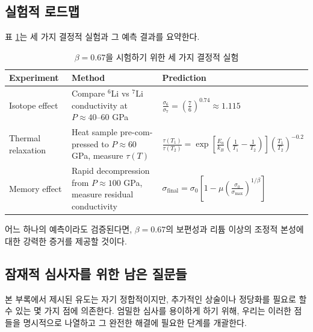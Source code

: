 \documentclass[11pt,a4paper]{article}
\theoremstyle{remark}
\begin{document}
	\subsection{실험적 로드맵}
	
	표 \ref{tab:experiments}는 세 가지 결정적 실험과 그 예측 결과를 요약한다.
	
	\begin{table}[H]
		\begin{otherlanguage}{english}
			\centering
			\caption{Three decisive experiments to test \(\beta = 0.67\)}
			\label{tab:experiments}
			\begin{tabular}{p{}p{}p{}}
				\toprule
				\textbf{Experiment} & \textbf{Method} & \textbf{Prediction} \\
				\midrule
				Isotope effect & Compare \(^6\)Li vs \(^7\)Li conductivity at \(P \approx 40\)–60 GPa & \(\displaystyle \frac{\sigma_6}{\sigma_7} = \left(\frac{7}{6}\right)^{0.74} \approx 1.115\) \\
				\hline
				Thermal relaxation & Heat sample pre-compressed to \(P \approx 60\) GPa, measure \(\tau(T)\) & \(\displaystyle \frac{\tau(T_1)}{\tau(T_2)} = \exp\left[\frac{E_a}{k_B}\left(\frac1{T_1}-\frac1{T_2}\right)\right] \left(\frac{T_1}{T_2}\right)^{-0.2}\) \\
				\hline
				Memory effect & Rapid decompression from \(P \approx 100\) GPa, measure residual conductivity & \(\displaystyle \sigma_{\text{final}} = \sigma_0\left[1 - \mu\left(\frac{\sigma_0}{\sigma_{\max}}\right)^{1/\beta}\right]\) \\
				\bottomrule
			\end{tabular}
		\end{otherlanguage}
		\caption{\(\beta = 0.67\)을 시험하기 위한 세 가지 결정적 실험}
	\end{table}
	
	어느 하나의 예측이라도 검증된다면, \(\beta = 0.67\)의 보편성과 리튬 이상의 조정적 본성에 대한 강력한 증거를 제공할 것이다.
	
	\subsection{잠재적 심사자를 위한 남은 질문들}
	\label{subsec:remaining-questions}
	
	본 부록에서 제시된 유도는 자기 정합적이지만, 추가적인 상술이나 정당화를 필요로 할 수 있는 몇 가지 점에 의존한다. 엄밀한 심사를 용이하게 하기 위해, 우리는 이러한 점들을 명시적으로 나열하고 그 완전한 해결에 필요한 단계를 개괄한다.
	
\end{document}
